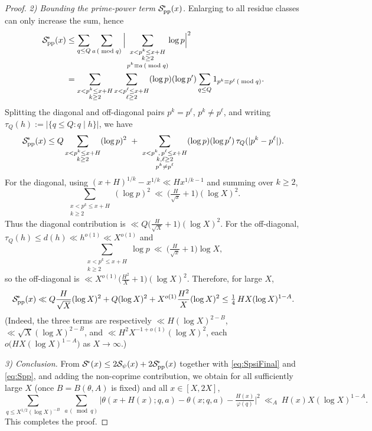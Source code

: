 \documentclass[11pt]{amsart}
\theoremstyle{definition}
\theoremstyle{remark}
\numberwithin{equation}{section}
\begin{document}
\begin{proof}
\smallskip
\noindent\emph{2) Bounding the prime-power term $\mathcal S_{\rm pp}^{\!*}(x)$.}
Enlarging to all residue classes can only increase the sum, hence
\begin{align*}
\mathcal S_{\rm pp}^{\!*}(x)&\le \sum_{q\le Q}\sum_{a\, (\bmod q)}\Big|\sum_{\substack{x<p^k\le x+H\\ k\ge2\\ p^k\equiv a\, (\bmod q)}}\!\log p\Big|^2\\
&=\sum_{\substack{x<p^k\le x+H\\ k\ge2}}\sum_{\substack{x<p^{\ell}\le x+H\\ \ell\ge2}}(\log p)(\log p')\sum_{q\le Q}1_{p^k\equiv p^{\ell}\, (\bmod q)}.
\end{align*}
Splitting the diagonal and off-diagonal pairs $p^k=p^{\ell}$, $p^k\ne p^{\ell}$, and writing $\tau_Q(h):=|\{q\le Q:q\mid h\}|$, we have
\[
\mathcal S_{\rm pp}^{\!*}(x)\le Q\sum_{\substack{x<p^k\le x+H\\ k\ge2}}(\log p)^2\ +\ \sum_{\substack{x<p^k,\,p^{\ell}\le x+H\\ k,\ell\ge2\\ p^k\ne p^{\ell}}}(\log p)(\log p')\,\tau_Q(|p^k-p^{\ell}|).
\]
For the diagonal, using $(x+H)^{1/k}-x^{1/k}\ll Hx^{1/k-1}$ and summing over $k\ge2$,
\[
\sum_{\substack{x<p^k\le x+H\\ k\ge2}}(\log p)^2\ \ll\ \Big(\tfrac{H}{\sqrt x}+1\Big)(\log X)^2.
\]
Thus the diagonal contribution is $\ll Q\big(\tfrac{H}{\sqrt X}+1\big)(\log X)^2$. For the off-diagonal, $\tau_Q(h)\le d(h)\ll h^{o(1)}\ll X^{o(1)}$ and
\[
\sum_{\substack{x<p^k\le x+H\\ k\ge2}}\!\log p\ \ll\ \Big(\tfrac{H}{\sqrt x}+1\Big)\log X,
\]
so the off-diagonal is $\ll X^{o(1)}\big(\tfrac{H^2}{X}+1\big)(\log X)^2$. Therefore, for large $X$,
\begin{equation}\label{eq:Spp}
\mathcal S_{\rm pp}^{\!*}(x)\ll Q\frac{H}{\sqrt X}(\log X)^2+Q(\log X)^2+X^{o(1)}\frac{H^2}{X}(\log X)^2\le \tfrac14\,H X(\log X)^{1-A}.
\end{equation}
(Indeed, the three terms are respectively $\ll H(\log X)^{2-B}$, $\ll \sqrt X(\log X)^{2-B}$, and $\ll H^2 X^{-1+o(1)}(\log X)^2$, each $o\big(HX(\log X)^{1-A}\big)$ as $X\to\infty$.)

\smallskip
\noindent\emph{3) Conclusion.}
From $\mathcal S^{\!*}(x)\le 2\mathcal S_{\psi}(x)+2\mathcal S_{\rm pp}^{\!*}(x)$ together with \eqref{eq:SpsiFinal} and \eqref{eq:Spp}, and adding the non-coprime contribution, we obtain for all sufficiently large $X$ (once $B=B(\theta,A)$ is fixed) and all $x\in[X,2X]$,
\[
\sum_{q\le X^{1/2}(\log X)^{-B}}\ \sum_{a\, (\bmod q)}\Big|\theta(x+H(x);q,a)-\theta(x;q,a)-\tfrac{H(x)}{\varphi(q)}\Big|^2\ \ll_A\ H(x) X(\log X)^{1-A}.
\]
This completes the proof.
\end{proof}
\end{document}
